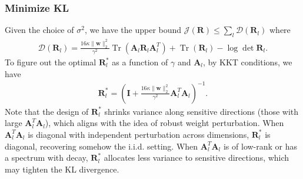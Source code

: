 \documentclass[journal]{IEEEtran} %
\def\vw{{\bm{w}}}
\def\mA{{\bm{A}}}
\def\mI{{\bm{I}}}
\def\mR{{\bm{R}}}
\def\gD{{\mathcal{D}}}
\def\gJ{{\mathcal{J}}}
\newcommand{\Norm}[1]{\|#1\|}
\DeclareMathOperator{\Tr}{Tr}
\begin{document}
\subsubsection{Minimize KL} Given the choice of $\sigma^2$, we have the upper bound $\gJ(\mR) \le \sum_l \gD(\mR_l)$ where
\begin{align} \label{eq:D_Rl_diag}
    \gD(\mR_l)=\frac{16 \kappa\Norm{\vw}_2^2}{\gamma^2} \Tr(\mA_l \mR_l \mA_l^T) + \Tr(\mR_l) - \log \det \mR_l.
\end{align}
% 
To figure out the optimal $\mR_l^*$ as a function of $\gamma$ and $\mA_l$, by KKT conditions, we have
\begin{align} \label{eq:opt-Rl}
    \mR_l^* = \left(\mI + \frac{16 \kappa\Norm{\vw}_2^2}{\gamma^2} \mA_l^T \mA_l  \right)^{-1}.
\end{align}
Note that the design of $\mR_l^*$ shrinks variance along sensitive directions (those with large $\mA_l^T\mA_l$), which aligns with the idea of robust weight perturbation. When $\mA_l^T\mA_l$ is diagonal with independent perturbation across dimensions, $\mR_l^*$ is diagonal, recovering somehow the i.i.d. setting. When $\mA_l^T\mA_l$ is of low-rank or has a spectrum with decay, $\mR_l^*$ allocates less variance to sensitive directions, which may tighten the KL divergence.
\end{document}
